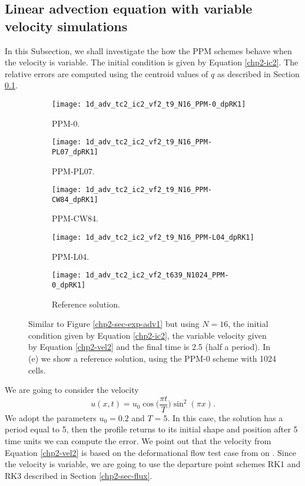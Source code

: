\subsection{Linear advection equation with variable velocity simulations}
\label{chp2-sec-numerical-exp-2}
In this Subsection, we shall investigate the how the PPM schemes behave when the velocity
is variable. The initial condition is given by Equation \eqref{chp2-ic2}.
The relative errors are computed using the centroid values of $q$ as described in
Section \ref{chp2-sec-numerical-exp-2}. 
\begin{figure}[!htb]
  \centering
  \begin{subfigure}{0.49\textwidth}
    \centering
			\texttt{[image: 1d\_adv\_tc2\_ic2\_vf2\_t9\_N16\_PPM-0\_dpRK1]}
			\caption{PPM-0.\label{chp2-sec-exp-adv5-a}}
  \end{subfigure}
  \begin{subfigure}{0.49\textwidth}
    \centering
			\texttt{[image: 1d\_adv\_tc2\_ic2\_vf2\_t9\_N16\_PPM-PL07\_dpRK1]}
			\caption{PPM-PL07.\label{chp2-sec-exp-adv5-b}}
  \end{subfigure}

  \begin{subfigure}{0.49\textwidth}
    \centering
		\texttt{[image: 1d\_adv\_tc2\_ic2\_vf2\_t9\_N16\_PPM-CW84\_dpRK1]}
    \caption{PPM-CW84.\label{chp2-sec-exp-adv5-c}}
  \end{subfigure}
  \begin{subfigure}{0.49\textwidth}
    \centering
			\texttt{[image: 1d\_adv\_tc2\_ic2\_vf2\_t9\_N16\_PPM-L04\_dpRK1]}
      \caption{PPM-L04.\label{chp2-sec-exp-adv5-d}}
  \end{subfigure} 

  \begin{subfigure}{0.49\textwidth}
    \centering
			\texttt{[image: 1d\_adv\_tc2\_ic2\_vf2\_t639\_N1024\_PPM-0\_dpRK1]}
      \caption{Reference solution.\label{chp2-sec-exp-adv5-e}}
  \end{subfigure} 
	\caption{ Similar to Figure \ref{chp2-sec-exp-adv1} but using $N=16$, 
	the initial condition given by Equation \eqref{chp2-ic2}, the variable velocity given by Equation
	\eqref{chp2-vel2} and the final time is 2.5 (half a period). In (e) we show a reference solution, using the PPM-0 scheme with 
	1024 cells. \label{chp2-sec-exp-adv5}}
\end{figure}

\newpage
We are going to consider the velocity
\begin{equation}
	\label{chp2-vel2}
	u(x,t) = u_0\cos{\bigg(\frac{\pi t}{T}\bigg)}\sin^2(\pi x).
\end{equation}
We adopt the parameters $u_0 = 0.2$ and $T = 5$.
In this case, the solution has a period equal to 5, then the profile returns to its
initial shape and position after 5 time units we can compute the error.
We point out that the velocity from Equation \eqref{chp2-vel2} is based on the deformational
flow test case from on \citet{nair:2010}. Since the velocity is variable, we are going to
use the departure point schemes RK1 and RK3 described in Section \ref{chp2-sec-flux}.

